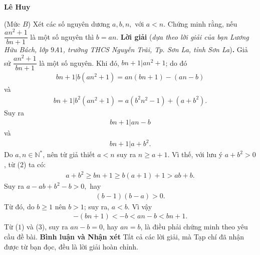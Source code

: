 \begin{multicols}{2}
	\begin{flushright}
		\textbf{\color{thachthuctoanhoc}Lê Huy}
	\end{flushright}
	{\color{thachthuctoanhoc}{\usefont{T5}{qag}{b}{n} P702.}}
	(Mức $B$) Xét các số nguyên dương $a,b,n,$  với $a<n.$ Chứng minh rằng, nếu  $\dfrac{an^2+1}{bn+1}$ là một số nguyên thì $b=an$. 
	\vskip 0.05cm
	\textbf{\color{thachthuctoanhoc}Lời giải} (\textit{dựa theo lời giải của bạn Lương Hữu Bách, lớp $9$A$1$, trường THCS Nguyễn Trãi, Tp. Sơn La, tỉnh Sơn La})\textbf{\color{thachthuctoanhoc}.}
	\vskip 0.05cm
	Giả sử $\dfrac{{a{n^2} + 1}}{{bn + 1}}$ là một số nguyên.
	\vskip 0.05cm
	Khi đó, $\left. {bn + 1} \right|a{n^2} + 1$;  do đó
	\begin{align*}
		\left. {bn \!+\! 1} \right|b\left( {a{n^2} \!+\! 1} \right) \!=\! an\left( {bn \!+\! 1} \right) \!-\! \left( {an \!-\! b} \right)
	\end{align*}
	và     
	\begin{align*}
		\left. {bn \!+\! 1} \right|{b^2}\left(\!{a{n^2} \!+\! 1} \!\right) \!=\! a\left( \!{{b^2}{n^2} \!-\! 1}\! \right) \!+\! \left(\!{a \!+\! {b^2}} \right).
	\end{align*}                                     
	Suy ra
	\begin{align*}
		\left. {bn + 1} \right|an - b \tag{$1$}
	\end{align*}
	và 
	\begin{align*}
		\left. {bn + 1} \right|a + {b^2}. \tag{$2$}
	\end{align*}
	Do $a, n \in \mathbb{N^*}$, nên từ giả thiết $a < n$ suy ra $n \ge  a + 1$. Vì thế, với lưu ý $a + b^2 > 0$,  từ ($2$) ta có:
	\begin{align*}
		a + {b^2} \ge bn + 1 \ge b\left( {a + 1} \right) + 1 > ab + b.
	\end{align*}
	Suy ra $a - ab + {b^2} - b > 0,$  hay
	\begin{align*}
		\left( {b - 1} \right)\left( {b - a} \right) > 0.
	\end{align*}
	Từ đó, do $b \ge 1$ nên $b > 1$; suy ra, $a < b$. Vì vậy
	\begin{align*}
		- \left( {bn + 1} \right) <  - b < an - b < bn + 1. \tag{$3$}
	\end{align*}
	Từ ($1$) và ($3$), suy ra $an - b = 0$, hay $an = b$, là điều phải chứng minh theo yêu cầu đề bài.
	\vskip 0.05cm
	\textbf{\color{thachthuctoanhoc}Bình luận và Nhận xét}
	\vskip 0.05cm
	Tất cả các lời giải, mà Tạp chí đã nhận được từ bạn đọc, đều là lời giải hoàn chỉnh.
	\begin{flushright}

\end{flushright}
\end{multicols}

